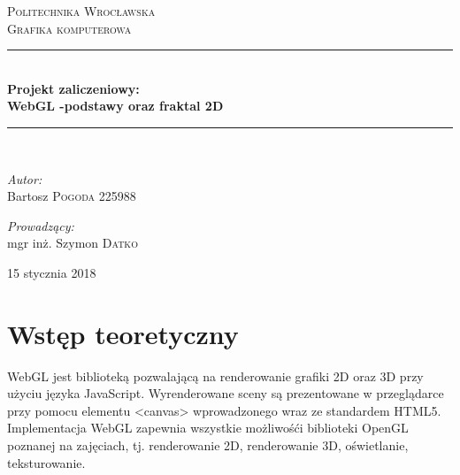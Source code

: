 \documentclass[a4paper,11pt]{article}
\begin{document}
\begin{titlepage}


\newcommand{\HRule}{\rule{\linewidth}{0.5mm}}
\center

\textsc{\LARGE Politechnika Wrocławska}\\[1.5cm]
\textsc{\LARGE Grafika komputerowa}\\[0.5cm]

\HRule \\[0.5cm]
{ \huge \bfseries Projekt zaliczeniowy: \\[0.3cm]WebGL -podstawy oraz fraktal 2D}\\[0.5cm] 
\HRule \\[1.5cm]

\begin{flushleft} \large
 
\emph{Autor:}\\
 
Bartosz  \textsc{Pogoda} 225988 \\
 
\end{flushleft}
 
\begin{flushright} \large
 
\emph{Prowadzący:} \\
mgr inż. Szymon \textsc{Datko} 
 
\end{flushright}
 
\vfill
{\large 15 stycznia 2018}\\[3cm] 
 
 
\end{titlepage}

\tableofcontents
\newpage

\section{Wstęp teoretyczny}

WebGL jest biblioteką pozwalającą na renderowanie grafiki 2D oraz 3D przy użyciu języka JavaScript. Wyrenderowane sceny są prezentowane w przeglądarce przy pomocu elementu <canvas> wprowadzonego wraz ze standardem HTML5. Implementacja WebGL zapewnia wszystkie możliwośći biblioteki OpenGL poznanej na zajęciach, tj.  renderowanie 2D, renderowanie 3D, oświetlanie, teksturowanie.
\end{document}
